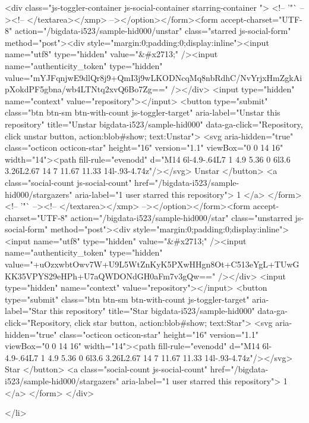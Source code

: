   <div class="js-toggler-container js-social-container starring-container ">
    <!-- '"` --><!-- </textarea></xmp> --></option></form><form accept-charset="UTF-8" action="/bigdata-i523/sample-hid000/unstar" class="starred js-social-form" method="post"><div style="margin:0;padding:0;display:inline"><input name="utf8" type="hidden" value="&#x2713;" /><input name="authenticity_token" type="hidden" value="mYJFqnjwE9dlQr8j9+QmI3j9wLKODNcqMq8nbRdhC/NvYrjxHmZgkAipXokdPF5gbna/wb4LTNtq2xvQ6Bo7Zg==" /></div>
      <input type="hidden" name="context" value="repository"></input>
      <button
        type="submit"
        class="btn btn-sm btn-with-count js-toggler-target"
        aria-label="Unstar this repository" title="Unstar bigdata-i523/sample-hid000"
        data-ga-click="Repository, click unstar button, action:blob#show; text:Unstar">
        <svg aria-hidden="true" class="octicon octicon-star" height="16" version="1.1" viewBox="0 0 14 16" width="14"><path fill-rule="evenodd" d="M14 6l-4.9-.64L7 1 4.9 5.36 0 6l3.6 3.26L2.67 14 7 11.67 11.33 14l-.93-4.74z"/></svg>
        Unstar
      </button>
        <a class="social-count js-social-count" href="/bigdata-i523/sample-hid000/stargazers"
           aria-label="1 user starred this repository">
          1
        </a>
</form>
    <!-- '"` --><!-- </textarea></xmp> --></option></form><form accept-charset="UTF-8" action="/bigdata-i523/sample-hid000/star" class="unstarred js-social-form" method="post"><div style="margin:0;padding:0;display:inline"><input name="utf8" type="hidden" value="&#x2713;" /><input name="authenticity_token" type="hidden" value="+uOzxwbtOwv7W+U9L5WtZnKyK5PXwHHgn8Ot+C513eYgL+TUwGKK35VPYS29eHPh+U7aQWDONdGH0aFm7v3gQw==" /></div>
      <input type="hidden" name="context" value="repository"></input>
      <button
        type="submit"
        class="btn btn-sm btn-with-count js-toggler-target"
        aria-label="Star this repository" title="Star bigdata-i523/sample-hid000"
        data-ga-click="Repository, click star button, action:blob#show; text:Star">
        <svg aria-hidden="true" class="octicon octicon-star" height="16" version="1.1" viewBox="0 0 14 16" width="14"><path fill-rule="evenodd" d="M14 6l-4.9-.64L7 1 4.9 5.36 0 6l3.6 3.26L2.67 14 7 11.67 11.33 14l-.93-4.74z"/></svg>
        Star
      </button>
        <a class="social-count js-social-count" href="/bigdata-i523/sample-hid000/stargazers"
           aria-label="1 user starred this repository">
          1
        </a>
</form>  </div>

  </li>

